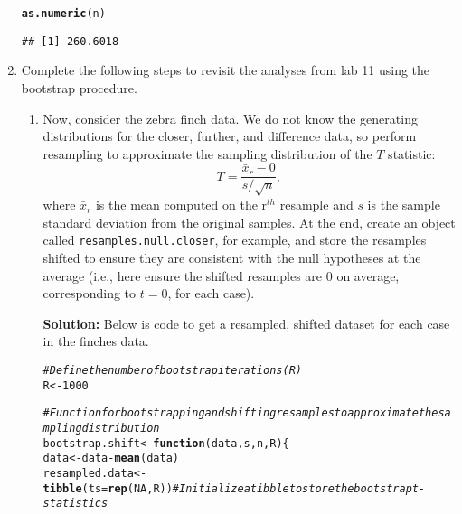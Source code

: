 \documentclass{article}\usepackage[]{graphicx}\usepackage[]{xcolor}
\makeatletter
\newcommand{\hlnum}[1]{\textcolor[rgb]{0.686,0.059,0.569}{#1}}%
\newcommand{\hlcom}[1]{\textcolor[rgb]{0.678,0.584,0.686}{\textit{#1}}}%
\newcommand{\hlopt}[1]{\textcolor[rgb]{0,0,0}{#1}}%
\newcommand{\hldef}[1]{\textcolor[rgb]{0.345,0.345,0.345}{#1}}%
\newcommand{\hlkwa}[1]{\textcolor[rgb]{0.161,0.373,0.58}{\textbf{#1}}}%
\newcommand{\hlkwb}[1]{\textcolor[rgb]{0.69,0.353,0.396}{#1}}%
\newcommand{\hlkwc}[1]{\textcolor[rgb]{0.333,0.667,0.333}{#1}}%
\newcommand{\hlkwd}[1]{\textcolor[rgb]{0.737,0.353,0.396}{\textbf{#1}}}%
\newenvironment{kframe}{%
 \def\at@end@of@kframe{}%
 \ifinner\ifhmode%
  \def\at@end@of@kframe{\end{minipage}}%
  \begin{minipage}{\columnwidth}%
 \fi\fi%
 \def\FrameCommand##1{\hskip\@totalleftmargin \hskip-\fboxsep
 \colorbox{shadecolor}{##1}\hskip-\fboxsep
     \hskip-\linewidth \hskip-\@totalleftmargin \hskip\columnwidth}%
 \MakeFramed {\advance\hsize-\width
   \@totalleftmargin\z@ \linewidth\hsize
   \@setminipage}}%
 {\par\unskip\endMakeFramed%
 \at@end@of@kframe}
\newenvironment{knitrout}{}{} %
\makeatother
\begin{document}
\begin{enumerate}
\begin{knitrout}
\begin{kframe}
\begin{alltt}
\hlkwd{as.numeric}\hldef{(n)}
\end{alltt}
\begin{verbatim}
## [1] 260.6018
\end{verbatim}
\end{kframe}
\end{knitrout}
\item Complete the following steps to revisit the analyses from lab 11 using the
bootstrap procedure.
\begin{enumerate}
\item Now, consider the zebra finch data. We do not know the generating distributions
for the closer, further, and difference data, so perform resampling to approximate the 
sampling distribution of the $T$ statistic:
  \[T = \frac{\bar{x}_r - 0}{s/\sqrt{n}},\]
  where $\bar{x}_r$ is the mean computed on the r$^{th}$ resample and $s$ is the
  sample standard deviation from the original samples. At the end, create an
  object called \texttt{resamples.null.closer}, for example, and store the 
  resamples shifted to ensure they are consistent with the null hypotheses at the average 
  (i.e., here ensure the shifted resamples are 0 on average, corresponding
  to $t=0$, for each case). 
  
  \textbf{Solution:} Below is code to get a resampled, shifted dataset for each case in the finches data.
\begin{knitrout}\scriptsize
{}\color{fgcolor}\begin{kframe}
\begin{alltt}
\hlcom{# Define the number of bootstrap iterations (R)}
\hldef{R} \hlkwb{<-} \hlnum{1000}

\hlcom{# Function for bootstrapping and shifting resamples to approximate the sampling distribution}
\hldef{bootstrap.shift} \hlkwb{<-} \hlkwa{function}\hldef{(}\hlkwc{data}\hldef{,} \hlkwc{s}\hldef{,} \hlkwc{n}\hldef{,} \hlkwc{R}\hldef{) \{}
\hldef{data} \hlkwb{<-} \hldef{data} \hlopt{-} \hlkwd{mean}\hldef{(data)}
\hldef{resampled.data} \hlkwb{<-} \hlkwd{tibble}\hldef{(}\hlkwc{ts} \hldef{=} \hlkwd{rep}\hldef{(}\hlnum{NA}\hldef{, R))}  \hlcom{# Initialize a tibble to store the bootstrap t-statistics}


\end{alltt}
\end{kframe}
\end{knitrout}
\end{enumerate}
\end{enumerate}
\end{document}
